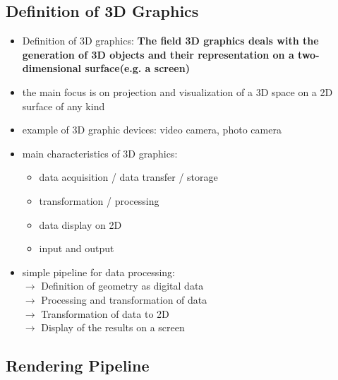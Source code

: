 \documentclass[12pt]{article}
\begin{document}
\subsection{Definition of 3D Graphics}

\begin{itemize}
	\item Definition of 3D graphics: \textbf{The field 3D graphics deals with the generation of 3D objects and their representation on a two-dimensional surface(e.g. a screen)}
	\item the main focus is on projection and visualization of a 3D space on a 2D surface of any kind
	\item example of 3D graphic devices: video camera, photo camera
	\item main characteristics of 3D graphics:
	\begin{itemize}
		\item data acquisition / data transfer / storage
		\item transformation / processing
		\item data display on 2D
		\item input and output
	\end{itemize}
	\item simple pipeline for data processing: \\
		$\rightarrow$ Definition of geometry as digital data \\
		$\rightarrow$ Processing and transformation of data \\
		$\rightarrow$ Transformation of data to 2D \\
		$\rightarrow$ Display of the results on a screen
\end{itemize}

\subsection{Rendering Pipeline}
\end{document}

